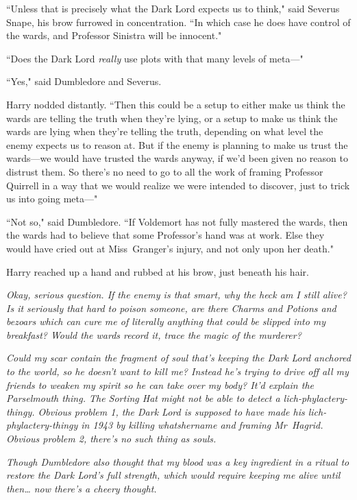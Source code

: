 ``Unless that is precisely what the Dark Lord expects us to think," said Severus Snape, his brow furrowed in concentration. ``In which case he does have control of the wards, and Professor Sinistra will be innocent."

``Does the Dark Lord \emph{really} use plots with that many levels of meta—"

``Yes," said Dumbledore and Severus.

Harry nodded distantly. ``Then this could be a setup to either make us think the wards are telling the truth when they're lying, or a setup to make us think the wards are lying when they're telling the truth, depending on what level the enemy expects us to reason at. But if the enemy is planning to make us trust the wards—we would have trusted the wards anyway, if we'd been given no reason to distrust them. So there's no need to go to all the work of framing Professor Quirrell in a way that we would realize we were intended to discover, just to trick us into going meta—"

``Not so," said Dumbledore. ``If Voldemort has not fully mastered the wards, then the wards had to believe that some Professor's hand was at work. Else they would have cried out at Miss~Granger's injury, and not only upon her death."

Harry reached up a hand and rubbed at his brow, just beneath his hair.

\emph{Okay, serious question. If the enemy is that smart, why the heck am I still alive? Is it seriously that hard to poison someone, are there Charms and Potions and bezoars which can cure me of literally anything that could be slipped into my breakfast? Would the wards record it, trace the magic of the murderer?}

\emph{Could my \emph{scar} contain the fragment of soul that's keeping the Dark Lord anchored to the world, so he doesn't want to kill me? Instead he's trying to drive off all my friends to weaken my spirit so he can take over my body? It'd explain the Parselmouth thing. The Sorting Hat might not be able to detect a lich-phylactery-thingy. Obvious problem 1, the Dark Lord is supposed to have made his lich-phylactery-thingy in 1943 by killing whatshername and framing Mr~Hagrid. Obvious problem 2, there's no such thing as souls.}

\emph{Though Dumbledore also thought that my blood was a key ingredient in a ritual to restore the Dark Lord's full strength, which would require keeping me alive until then{\ldots} now there's a cheery thought.}

